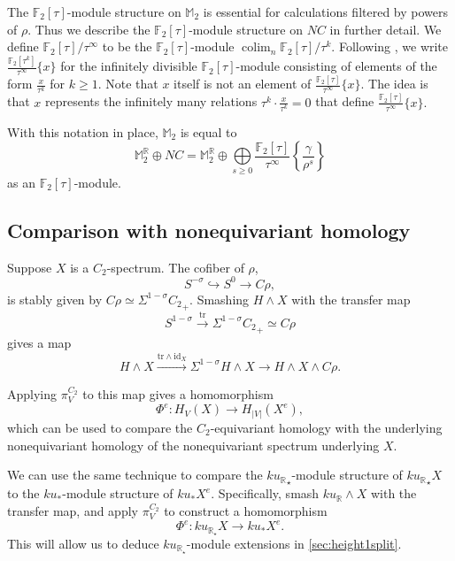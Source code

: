 \documentclass{amsart}
\theoremstyle{plain}
\numberwithin{equation}{section}
\numberwithin{figure}{section}
\DeclareMathOperator*{\colim}{colim}
\newcommand{\mF}{{\mathbb F}}
\newcommand{\mM}{{\mathbb M}}
\newcommand{\mR}{{\mathbb R}}
\newcommand{\0}{\langle 0 \rangle }
\begin{document}
 The $\mF_2[\tau]$-module structure on $\mM_2$ is essential for calculations filtered by powers of $\rho.$ Thus we describe the $\mF_2[\tau]$-module structure on $NC$ in further detail. We define $\mF_2 [\tau]/\tau^\infty$ to be the $\mF_2[\tau]$-module $\colim_n \mF_2[\tau] / \tau^k$. Following \cite[Remark~2.1]{GuillouHillIsaksenRavenel2020}, we write $\frac{\mF_2 [\tau^{k}]}{\tau^\infty} \{x\}$ for the infinitely divisible $\mF_2[\tau]$-module consisting of elements of the form $\frac{x}{\tau^k}$ for $k \geq 1.$ Note that $x$ itself is not an element of $\frac{\mF_2 [\tau]}{\tau^\infty} \{x\}.$ The idea is that $x$ represents the infinitely many relations $\tau^k \cdot \frac{x}{\tau^k} = 0$ that define $\frac{\mF_2 [\tau]}{\tau^\infty} \{x\}.$

 With this notation in place, $\mM_2$ is equal to 
 \[
 \mM^{\mR}_2 \oplus NC = \mM^\mR_2 \oplus \underset{s \geq 0}{\bigoplus} \frac{\mF_2[\tau]}{\tau^\infty} \left\{ \frac{\gamma}{\rho^s} \right\}
 \]
 as an $\mF_2[\tau]$-module.

 \subsection{Comparison with nonequivariant homology} 

 Suppose $X$ is a $C_2$-spectrum. The cofiber of $\rho$,
 \[
 S^{-\sigma} \hookrightarrow S^0 \to C\rho,
 \] 
is stably given by $C\rho \simeq \Sigma^{1-\sigma} {C_2}_+$. Smashing $H \wedge X $ with the transfer map
\[
S^{1-\sigma} \xrightarrow[]{\mathrm{tr}} \Sigma^{1-\sigma}{C_2}_+\simeq C\rho
\]
gives a map
 \[
 H \wedge X \xrightarrow{\mathrm{tr} \wedge \mathrm{id}_X} \Sigma^{1-\sigma}H \wedge X \to H \wedge X \wedge C\rho.
 \]

 
 Applying $\pi_V^{C_2}$ to this map gives a homomorphism 
 \[
 \Phi^e: H_V(X) \to H_{\vert V \vert} (X^e),\]
 which can be used to compare the $C_2$-equivariant homology with the underlying nonequivariant homology of the nonequivariant spectrum underlying $X.$

 We can use the same technique to compare the ${ku_\mR}_{\star}$-module structure of ${ku_\mR}_{\star}X$ to the $ku_{*}$-module structure of $ku_{*}X^{e}$. Specifically, smash $ku_{\mR} \wedge X$ with the transfer map, and apply $\pi_{V}^{C_2}$ to construct a homomorphism
 \[ \Phi^{e}: ku_{{\mR}_{\star}}X \to ku_{*}X^{e} .\]
 This will allow us to deduce $ku_{{\mR}_{\star}}$-module extensions in \cref{sec:height1split}.
\end{document}
